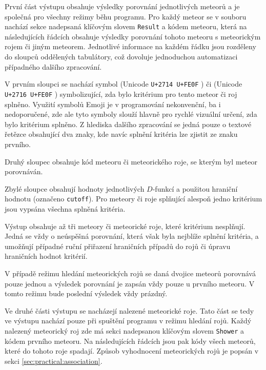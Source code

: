 \medskip

První část výstupu obsahuje výsledky porovnání jednotlivých meteorů a je společná pro všechny režimy běhu programu. Pro každý meteor se v souboru nachází sekce nadepsaná klíčovým slovem \texttt{Result} a kódem meteoru, která na následujících řádcích obsahuje výsledky porovnání tohoto meteoru s meteorickým rojem či jiným meteorem. Jednotlivé informace na každém řádku jsou rozděleny do sloupců oddělených tabulátory, což dovoluje jednoduchou automatizaci případného dalšího zpracování.

V prvním sloupci se nachází symbol \eCheck\hspace{4pt}(Unicode \texttt{U+2714 U+FE0F} \cite{unicode}) či \eCross\hspace{4pt}(Unicode \texttt{U+2716 U+FE0F} \cite{unicode}) symbolizující, zda bylo kritérium pro tento meteor či roj splněno. Využití symbolů Emoji je v programování nekonvenční, ba i nedoporučené, zde ale tyto symboly slouží hlavně pro rychlé vizuální určení, zda bylo kritérium splněno. Z hlediska dalšího zpracování se jedná pouze o textové řetězce obsahující dva znaky, kde navíc splnění kritéria lze zjistit ze znaku prvního.

Druhý sloupec obsahuje kód meteoru či meteorického roje, se kterým byl meteor porovnáván.

Zbylé sloupce obsahují hodnoty jednotlivých $D$-funkcí a použitou hraniční hodnotu (označeno \texttt{cutoff}). Pro meteory či roje splňující alespoň jedno kritérium jsou vypsána všechna splněná kritéria.

\smallskip

Výstup obsahuje až tři meteory či meteorické roje, které kritérium nesplňují. Jedná se vždy o neúspěšná porovnání, která však byla nejblíže splnění kritéria, a umožňují případné ruční přiřazení hraničních případů do rojů či úpravu hraničních hodnot kritérií.

V případě režimu hledání meteorických rojů se daná dvojice meteorů porovnává pouze jednou a výsledek porovnání je zapsán vždy pouze u prvního meteoru. V tomto režimu bude poslední výsledek vždy prázdný.

\medskip

Ve druhé části výstupu se nacházejí nalezené meteorické roje. Tato část se tedy ve výstupu nachází pouze při spuštění programu v režimu hledání rojů. Každý nalezený meteorický roj zde má sekci nadepsanou klíčovým slovem \texttt{Shower} a kódem prvního meteoru. Na následujících řádcích jsou pak kódy všech meteorů, které do tohoto roje spadají. Způsob vyhodnocení meteorických rojů je popsán v sekci \ref{sec:practical:association}.

